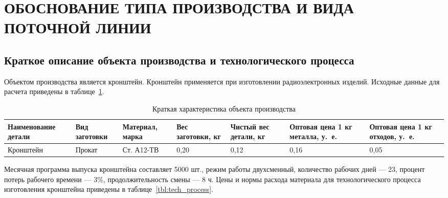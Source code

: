\section[Обоснование типа производства и вида поточной линии]{
  ОБОСНОВАНИЕ ТИПА ПРОИЗВОДСТВА И ВИДА \\
  ПОТОЧНОЙ ЛИНИИ
}
\label{sec:choice}

\subsection{
  Краткое описание объекта производства и 
  технологического процесса
}

Объектом производства является кронштейн.
Кронштейн применяется при изготовлении радиоэлектронных изделий.
Исходные данные для расчета приведены в таблице~\ref{tbl:piece_description}.

\begin{table} [h!]
  \caption{
    Краткая характеристика объекта производства
  }\label{tbl:piece_description}
  {\small
    \begin{tabular}{| m{2.7cm} | m{1.7cm} | m{2.1cm} | m{1.9cm} | m{1.4cm} | m{1.8cm} | m{1.8cm} |}
      \hline
      Наименование детали & Вид заготовки & Материал, марка
      & Вес заготовки, кг & Чистый вес детали, кг
      & Оптовая цена 1 кг металла, у.~е. & Оптовая цена 1 кг отходов, у.~е. \\
      \hline
      Кронштейн & Прокат & Ст. А12-ТВ
      & 0{,}20 & 0{,}12 
      & 0{,}16 & 0{,}05 \\
      \hline
    \end{tabular}
  }
\end{table}

Месячная программа выпуска кронштейна составляет 5000 шт.,
режим работы двухсменный, количество рабочих дней --- 23,
процент потерь рабочего времени --- 3\%, продолжительность смены --- 8 ч.
Цены и нормы расхода материала для технологического 
процесса изготовления кронштейна приведены в таблице~\ref{tbl:tech_process}.

